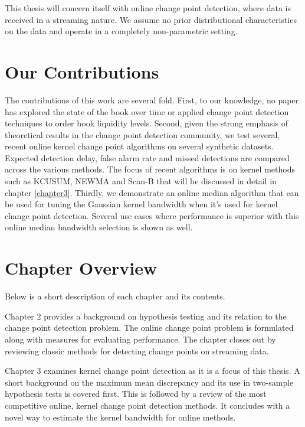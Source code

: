 This thesis will concern itself with online change point detection, where data is received in a streaming nature. We assume no prior distributional characteristics on the data and operate in a completely non-parametric setting. 


\section{Our Contributions}
The contributions of this work are several fold. First, to our knowledge, no paper has explored the state of the book over time or applied change point detection techniques to order book liquidity levels. Second, given the strong emphasis of theoretical results in the change point detection community, we test several, recent online kernel change point algorithms on several synthetic datasets. Expected detection delay, false alarm rate and missed detections are compared across the various methods. The focus of recent algorithms is on kernel methods such as KCUSUM, NEWMA and Scan-B that will be discussed in detail in chapter \ref{chapter3}. Thirdly, we demonstrate an online median algorithm that can be used for tuning the Gaussian kernel bandwidth when it's used for kernel change point detection. Several use cases where performance is superior with this online median bandwidth selection is shown as well. 

\section{Chapter Overview}
Below is a short description of each chapter and its contents. %

Chapter 2 provides a background on hypothesis testing and its relation to the change point detection problem. The online change point problem is formulated along with measures for evaluating performance. The chapter closes out by reviewing classic methods for detecting change points on streaming data.

Chapter 3 examines kernel change point detection as it is a focus of this thesis. A short background on the maximum mean discrepancy and its use in two-sample hypothesis tests is covered first. This is followed by a review of the most competitive online, kernel change point detection methods. It concludes with a novel way to estimate the kernel bandwidth for online methods.


